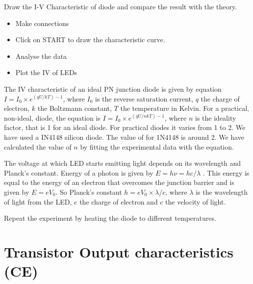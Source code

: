 \documentclass[a4paper,12pt,english]{sphinxmanual}
\let\sphinxpxdimen\pdfpxdimen\else\newdimen\sphinxpxdimen
\begin{document}
Draw the I-V Characteristic of diode and compare the result with the
theory.


\noindent\sphinxincludegraphics[width=300\sphinxpxdimen]{{diode_iv}.pdf}
\noindent\sphinxincludegraphics[width=300\sphinxpxdimen]{{diode-iv-screen}.pdf}
\begin{itemize}
\item {} 
Make connections

\item {} 
Click on START to draw the characteristic curve.

\item {} 
Analyse the data

\item {} 
Plot the IV of LEDs

\end{itemize}


The IV characteristic of an ideal PN junction diode is given by equation
\(I = I_0 \times e^{(qU/kT) - 1}\), where \(I_0\) is the reverse saturation
current, \(q\) the charge of electron, \(k\) the Boltzmann constant, \(T\) the
temperature in Kelvin. For a practical, non-ideal, diode, the equation
is \(I = I_0 \times e^{(qU/nkT) - 1}\), where \(n\) is the ideality factor, that
is 1 for an ideal diode. For practical diodes it varies from 1 to 2. We
have used a IN4148 silicon diode. The value of  for 1N4148 is around 2.
We have calculated the value of \(n\) by fitting the experimental data with
the equation.

The voltage at which LED starts emitting light depends on its wavelength
and Planck’s constant. Energy of a photon is given by \(E = h\nu  = hc/\lambda\) .
This energy is equal to the energy of an electron that overcomes the
junction barrier and is given by \(E = eV_0\). So Planck’s constant
\(h = eV_0 \times \lambda / c\), where \(\lambda\) is the wavelength of light from the LED, \(e\)
the charge of electron and \(c\) the velocity of light.

Repeat the experiment by heating the diode to different temperatures.


\section{Transistor Output characteristics (CE)}
\label{\detokenize{3.12:transistor-output-characteristics-ce}}\label{\detokenize{3.12::doc}}
\end{document}
